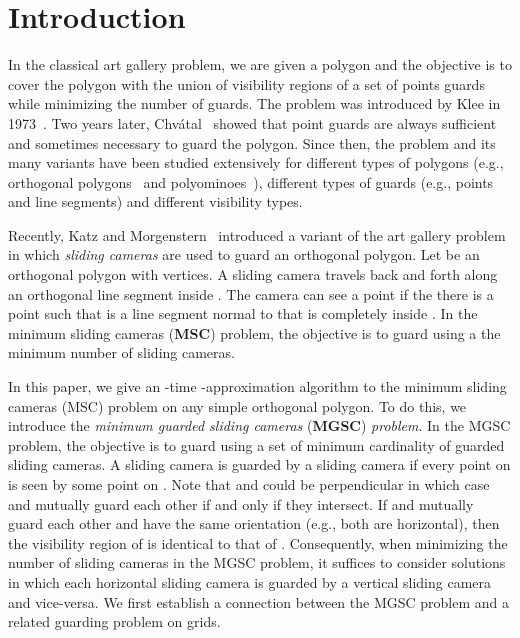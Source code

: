 \documentclass{llncs}
\begin{document}
\section{Introduction}
\label{sec:introduction}
In the classical art gallery problem, we are given
a polygon and the objective is to cover the polygon with the union of visibility
regions of a set of points guards while minimizing the number of guards. The problem was introduced by Klee
in 1973~\cite{orourke1987}. Two years later, Chv\'{a}tal~\cite{chvatal1975} showed that 
point guards are always sufficient and sometimes necessary to guard the polygon.
Since then, the problem and its many variants have been studied extensively for
different types of polygons (e.g., orthogonal polygons~\cite{dietmar1995} and polyominoes~\cite{biedl2012}), different types of
guards (e.g., points and line segments) and different visibility types.

Recently, Katz and Morgenstern~\cite{katz2011} introduced a variant of the art gallery problem
in which \emph{sliding cameras} are used to guard an
orthogonal polygon. Let  be an orthogonal polygon with  vertices. A sliding camera travels back and forth along an
orthogonal line segment  inside . The camera can
see a point  if the there is a point  such that
 is a line segment normal to  that is completely inside . In the minimum
sliding cameras ({\bf MSC}) problem, the objective is to guard  using a
the minimum number of sliding cameras.

In this paper, we give an -time -approximation algorithm to the minimum sliding cameras (MSC)
problem on any simple orthogonal polygon.
To do this, we introduce the \emph{minimum guarded sliding cameras} ({\bf MGSC})
\emph{problem}. In the MGSC problem, the objective is to guard  using a set of minimum
cardinality of guarded sliding cameras.
A sliding camera  is guarded by a sliding camera  if every point on  is seen by some point on . Note that  and  could be perpendicular in which case  and  mutually guard each other if and only if they intersect. If  and  mutually guard each other and have the same orientation (e.g., both are horizontal), then the visibility region of  is identical to that of . Consequently, when minimizing the number of sliding cameras in the MGSC problem, it suffices to consider solutions in which each horizontal sliding camera is guarded by a vertical sliding camera and vice-versa.
We first establish a connection between the MGSC problem and a related guarding problem on grids.
\end{document}
